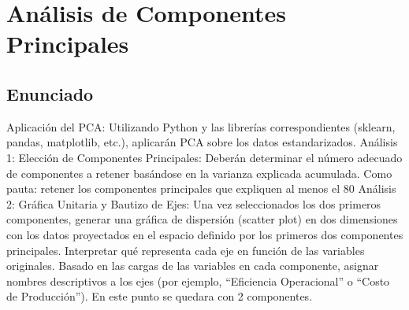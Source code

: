 \newpage
\section{Análisis de Componentes Principales}
\subsection{Enunciado}
Aplicación del PCA: Utilizando Python y las librerías correspondientes (sklearn, pandas, matplotlib, etc.), aplicarán PCA sobre los datos estandarizados.
Análisis 1: Elección de Componentes Principales: Deberán determinar el número adecuado de componentes a retener basándose en la varianza explicada acumulada. Como pauta: retener los componentes principales que expliquen al menos el 80%
Análisis 2: Gráfica Unitaria y Bautizo de Ejes:
Una vez seleccionados los dos primeros componentes, generar una gráfica de dispersión (scatter plot) en dos dimensiones con los datos proyectados en el espacio definido por los primeros dos componentes principales. Interpretar qué representa cada eje en función de las variables originales. Basado en las cargas de las variables en cada componente, asignar nombres descriptivos a los ejes (por ejemplo, “Eficiencia Operacional” o “Costo de Producción”). En este punto se quedara con 2 componentes.

